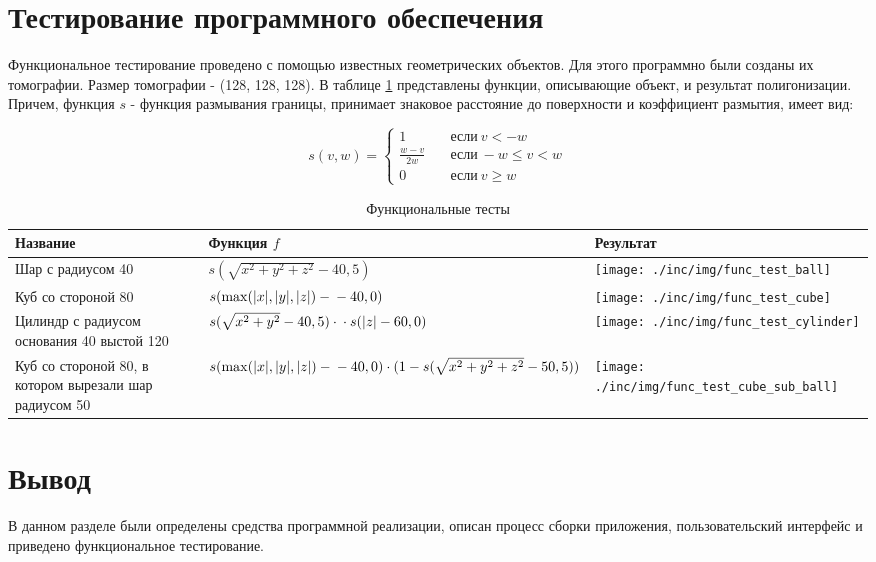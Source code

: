 \section{Тестирование программного обеспечения}

Функциональное тестирование проведено с помощью известных геометрических объектов. Для этого программно были созданы их томографии. Размер томографии - (128, 128, 128). В таблице \ref{func_tests} представлены функции, описывающие объект, и результат полигонизации. Причем, функция $s$ - функция размывания границы, принимает знаковое расстояние до поверхности и коэффициент размытия,  имеет вид:

\begin{equation}
    s(v, w) = \begin{cases}
       1 &\quad\text{если}\ v < -w \\
       \frac{w - v}{2 w} &\quad\text{если}\  -w \le v < w \\
       0 &\quad\text{если}\ v \ge w
     \end{cases}
\end{equation}

\begin{table}
    \centering
    \caption{Функциональные тесты}
    \label{func_tests}
    \begin{tabularx}{\textwidth}{|X|X|X|}
        \hline
        Название & Функция $f$ & Результат \\
        \hline
        Шар с радиусом 40 & $s(\sqrt{x^2 + y^2 + z^2} - 40, 5)$ & \vspace{5mm} \texttt{[image: ./inc/img/func\_test\_ball]} \\
        \hline
        Куб со стороной 80 & $s(\max(|x|, |y|, |z|) - \newline - 40, 0)$ & \vspace{5mm} \texttt{[image: ./inc/img/func\_test\_cube]} \\
        \hline
         Цилиндр с радиусом основания 40 выстой 120 & $s(\sqrt{x^2 + y^2} - 40, 5) \cdot \newline \cdot s(|z| - 60, 0) $ & \vspace{5mm} \texttt{[image: ./inc/img/func\_test\_cylinder]} \\
        \hline
        Куб со стороной 80, в котором вырезали шар радиусом 50 & $s(\max(|x|, |y|, |z|) - \newline - 40, 0) \cdot (1 - s(\newline\sqrt{x^2 + y^2 + z^2} - 50, 5))$ & \vspace{5mm} \texttt{[image: ./inc/img/func\_test\_cube\_sub\_ball]} \\
        \hline
    \end{tabularx}
\end{table}

\section*{Вывод}

В данном разделе были определены средства программной реализации, описан процесс сборки приложения, пользовательский интерфейс и приведено функциональное тестирование.